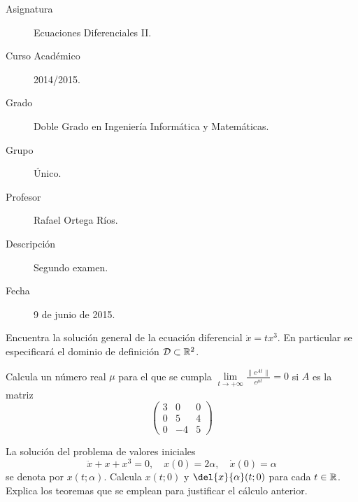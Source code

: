 \documentclass[12pt]{article}
\begin{document}

    
    

    \begin{description}
        \item[Asignatura] Ecuaciones Diferenciales II.
        \item[Curso Académico] 2014/2015.
        \item[Grado] Doble Grado en Ingeniería Informática y Matemáticas.
        \item[Grupo] Único.
        \item[Profesor] Rafael Ortega Ríos.
        \item[Descripción] Segundo examen.
        \item[Fecha] 9 de junio de 2015.
    \end{description}
    \newpage


    
    \begin{ejercicio}
        Encuentra la solución general de la ecuación diferencial $\dot{x} = tx^3$. En particular se especificará el dominio de definición $\mathcal{D} \subset \mathbb{R}^2$.
    \end{ejercicio}

    \begin{ejercicio}
        Calcula un número real $\mu$ para el que se cumpla $\lim\limits_{t \to +\infty} \frac{\|e^{At}\|}{e^{\mu t}} = 0$ si $A$ es la matriz
        \[
        \begin{pmatrix}
            3 & 0 & 0 \\
            0 & 5 & 4 \\
            0 & -4 & 5
        \end{pmatrix}
        \]
    \end{ejercicio}

    \begin{ejercicio}
        La solución del problema de valores iniciales
        \[
        \ddot{x} + x + x^3 = 0, \quad x(0) = 2\alpha, \quad \dot{x}(0) = \alpha
        \]
        se denota por $x(t; \alpha)$. Calcula $x(t; 0)$ y $\del{x}{\alpha}(t; 0)$ para cada $t \in \mathbb{R}$. Explica los teoremas que se emplean para justificar el cálculo anterior.
    \end{ejercicio}
\end{document}
